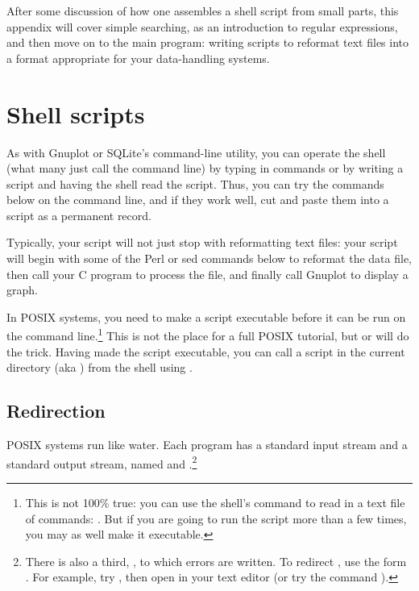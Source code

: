 After some discussion of how one assembles a shell script from small
parts, this appendix will cover simple searching, as an introduction to
regular expressions, and then move on to the main program: writing
scripts to reformat text files into a format appropriate for your
data-handling systems.

\section{Shell scripts} As with Gnuplot or SQLite's command-line
utility, you can operate the shell (what many just call the command line)
by typing in commands or by writing a script and having the shell read
the script. Thus, you can try the commands below on the command line,
and if they work well, cut and paste them into a script as a permanent
record. 

Typically, your script will not just stop with reformatting text files:
your script will begin with some of the Perl or sed commands below to
reformat the data file, then call your C program to process the file, and
finally call Gnuplot to display a graph. 

In POSIX systems, you need to make a script executable before it can be
run on the command line.\footnote{This is not 100\% true: you can use
the shell's  command to read in a text file of commands:
. But if you are going to run the script more than a
few times, you may as well make it executable.} This is not the place
for a full POSIX tutorial, but  or  will do the trick. Having made the script executable, you
can call a script in the current directory (aka ) from the shell
using .

\subsection{Redirection} 
POSIX systems run like water. Each program has a standard input stream
and a standard output stream, named  and
.\footnote{There is also a third, , to which
errors are written. To redirect , use the form \ci{\&>}. For
example, try , then open  in your text editor
(or try the command ).}

